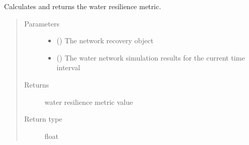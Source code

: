 \documentclass[letterpaper,10pt,english]{sphinxmanual}
\begin{document}
\begin{fulllineitems}
\begin{fulllineitems}
\begin{quote}
\begin{description}
\end{description}\end{quote}

\end{fulllineitems}


\begin{fulllineitems}
\label{\detokenize{apidoc:dreaminsg_integrated_model.src.resilience_metrics.WeightedResilienceMetric.calculate_water_resmetric}}
\sphinxAtStartPar
Calculates and returns the water resilience metric.
\begin{quote}\begin{description}
\item[{Parameters}] \leavevmode\begin{itemize}
\item {} 
\sphinxAtStartPar
{} () \textendash{} The network recovery object

\item {} 
\sphinxAtStartPar
{} () \textendash{} The water network simulation results for the current time interval

\end{itemize}

\item[{Returns}] \leavevmode
\sphinxAtStartPar
water resilience metric value

\item[{Return type}] \leavevmode
\sphinxAtStartPar
float

\end{description}\end{quote}

\end{fulllineitems}


\end{fulllineitems}
\end{document}
